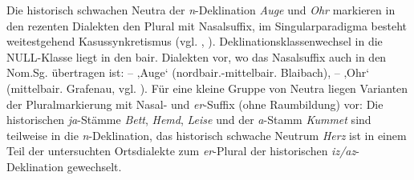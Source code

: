 Die historisch schwachen Neutra der \textit{n}-Deklination \textit{Auge} und \textit{Ohr} markieren in den rezenten Dialekten den Plural mit Nasalsuffix, im Singularparadigma besteht weitestgehend Kasussynkretismus (vgl. , \citealt[88]{Rowley1997}). Deklinationsklassenwechsel in die NULL-Klasse liegt in den bair. Dialekten vor, wo das Nasalsuffix auch in den Nom.Sg. übertragen ist:  --  ‚Auge‘ (nordbair.-mittelbair. Blaibach),  --  ‚Ohr‘ (mittelbair. Grafenau, vgl. \citealt[426]{Rowley1990b}). Für eine kleine Gruppe von Neutra liegen Varianten der Pluralmarkierung mit Nasal- und \textit{er}{}-Suffix (ohne Raumbildung) vor: Die historischen \textit{ja}{}-Stämme \textit{Bett}, \textit{Hemd}, \textit{Leise} und der \textit{a}{}-Stamm \textit{Kummet} sind teilweise in die \textit{n}{}-Deklination, das historisch schwache Neutrum \textit{Herz} ist in einem Teil der untersuchten Ortsdialekte zum \textit{er}{}-Plural der historischen \textit{iz/az}{}-Deklination gewechselt.

